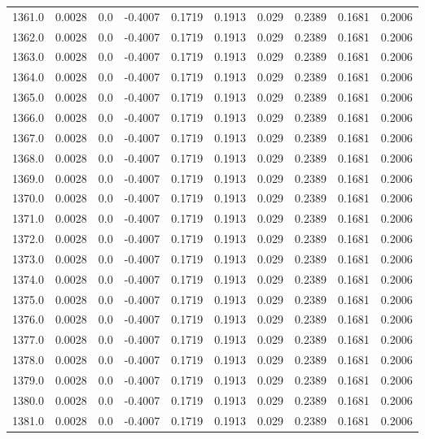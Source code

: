 \begin{longtable}{lrrrrrrrrr}
1361.0 & 0.0028 & 0.0 & -0.4007 & 0.1719 & 0.1913 & 0.029 & 0.2389 & 0.1681 & 0.2006 \\
1362.0 & 0.0028 & 0.0 & -0.4007 & 0.1719 & 0.1913 & 0.029 & 0.2389 & 0.1681 & 0.2006 \\
1363.0 & 0.0028 & 0.0 & -0.4007 & 0.1719 & 0.1913 & 0.029 & 0.2389 & 0.1681 & 0.2006 \\
1364.0 & 0.0028 & 0.0 & -0.4007 & 0.1719 & 0.1913 & 0.029 & 0.2389 & 0.1681 & 0.2006 \\
1365.0 & 0.0028 & 0.0 & -0.4007 & 0.1719 & 0.1913 & 0.029 & 0.2389 & 0.1681 & 0.2006 \\
1366.0 & 0.0028 & 0.0 & -0.4007 & 0.1719 & 0.1913 & 0.029 & 0.2389 & 0.1681 & 0.2006 \\
1367.0 & 0.0028 & 0.0 & -0.4007 & 0.1719 & 0.1913 & 0.029 & 0.2389 & 0.1681 & 0.2006 \\
1368.0 & 0.0028 & 0.0 & -0.4007 & 0.1719 & 0.1913 & 0.029 & 0.2389 & 0.1681 & 0.2006 \\
1369.0 & 0.0028 & 0.0 & -0.4007 & 0.1719 & 0.1913 & 0.029 & 0.2389 & 0.1681 & 0.2006 \\
1370.0 & 0.0028 & 0.0 & -0.4007 & 0.1719 & 0.1913 & 0.029 & 0.2389 & 0.1681 & 0.2006 \\
1371.0 & 0.0028 & 0.0 & -0.4007 & 0.1719 & 0.1913 & 0.029 & 0.2389 & 0.1681 & 0.2006 \\
1372.0 & 0.0028 & 0.0 & -0.4007 & 0.1719 & 0.1913 & 0.029 & 0.2389 & 0.1681 & 0.2006 \\
1373.0 & 0.0028 & 0.0 & -0.4007 & 0.1719 & 0.1913 & 0.029 & 0.2389 & 0.1681 & 0.2006 \\
1374.0 & 0.0028 & 0.0 & -0.4007 & 0.1719 & 0.1913 & 0.029 & 0.2389 & 0.1681 & 0.2006 \\
1375.0 & 0.0028 & 0.0 & -0.4007 & 0.1719 & 0.1913 & 0.029 & 0.2389 & 0.1681 & 0.2006 \\
1376.0 & 0.0028 & 0.0 & -0.4007 & 0.1719 & 0.1913 & 0.029 & 0.2389 & 0.1681 & 0.2006 \\
1377.0 & 0.0028 & 0.0 & -0.4007 & 0.1719 & 0.1913 & 0.029 & 0.2389 & 0.1681 & 0.2006 \\
1378.0 & 0.0028 & 0.0 & -0.4007 & 0.1719 & 0.1913 & 0.029 & 0.2389 & 0.1681 & 0.2006 \\
1379.0 & 0.0028 & 0.0 & -0.4007 & 0.1719 & 0.1913 & 0.029 & 0.2389 & 0.1681 & 0.2006 \\
1380.0 & 0.0028 & 0.0 & -0.4007 & 0.1719 & 0.1913 & 0.029 & 0.2389 & 0.1681 & 0.2006 \\
1381.0 & 0.0028 & 0.0 & -0.4007 & 0.1719 & 0.1913 & 0.029 & 0.2389 & 0.1681 & 0.2006 \\

\end{longtable}
